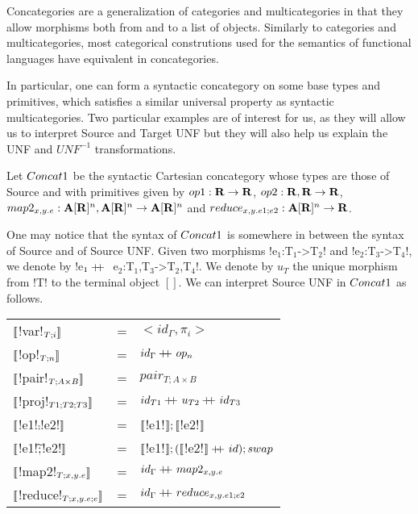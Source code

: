 Concategories are a generalization of categories and multicategories in that 
they allow morphisms both from and to a list of objects. 
Similarly to categories and multicategories, 
most categorical construtions used for the semantics of functional languages 
have equivalent in concategories.

In particular, one can form a syntactic concategory on some base types and primitives, 
which satisfies a similar universal property as syntactic multicategories.
Two particular examples are of interest for us, as they will allow us to interpret Source and Target UNF
but they will also help us explain the UNF and $UNF^{-1}$ transformations.

\begin{definition}[$\ConcatS$]
Let $\ConcatS$ be the syntactic Cartesian concategory whose types are those of Source and 
with primitives given by $op1: \mathbf{R} \to \mathbf{R}$, $op2: \mathbf{R},\mathbf{R} \to \mathbf{R}$, 
$map2_{x,y.e}: \mathbf{A}[\mathbf{R}]^{n},\mathbf{A}[\mathbf{R}]^{n}\to \mathbf{A}[\mathbf{R}]^{n}$ and $reduce_{x,y.e1;e2}:\mathbf{A}[\mathbf{R}]^{n}\to \mathbf{R}$.
\end{definition}

One may notice that the syntax of $\ConcatS$ is somewhere in between the syntax of Source and of Source UNF.
Given two morphisms !e$_1$:T$_1$->T$_2$! and !e$_2$:T$_3$->T$_4$!, we denote by !e$_1 +\kern-1.3ex+\kern0.8ex$ e$_2$:T$_1$,T$_3$->T$_2$,T$_4$!.
We denote by $u_T$ the unique morphism from !T! to the terminal object $[]$.
We can interpret Source UNF in $\ConcatS$ as follows.

\begin{tabular}{l c l}
   $\llbracket$!var!$_{T;i} \rrbracket$ &=& $<id_\Gamma,\pi_i>$ \\
   $\llbracket$!op!$_{T;n} \rrbracket$ &=& $id_\Gamma+\kern-1.3ex+\kern0.8ex op_n$\\
   $\llbracket$!pair!$_{T;A\times B} \rrbracket$ &=& $pair_{T;A\times B}$ \\
   $\llbracket$!proj!$_{T1;T2;T3} \rrbracket$ &=& $id_{T1}+\kern-1.3ex+\kern0.8ex u_{T2}+\kern-1.3ex+\kern0.8ex id_{T3}$\\
   $\llbracket$!e1!$\comp$!e2!$\rrbracket$  &=& $\llbracket$!e1!$\rrbracket ; \llbracket$!e2!$\rrbracket$ \\
   $\llbracket$!e1!$\widetilde{;}$!e2!$\rrbracket$ &=& $\llbracket$!e1!$\rrbracket ; (\llbracket$!e2!$\rrbracket+\kern-1.3ex+\kern0.8ex id ); swap$ \\
   $\llbracket$!map2!$_{T;x,y.e}\rrbracket$  &=& $id_\Gamma+\kern-1.3ex+\kern0.8ex map2_{x,y.e}$ \\
   $\llbracket$!reduce!$_{T;x,y.e;e}\rrbracket$ &=& $id_\Gamma+\kern-1.3ex+\kern0.8ex reduce_{x,y.e1;e2}$ \\
\end{tabular}

